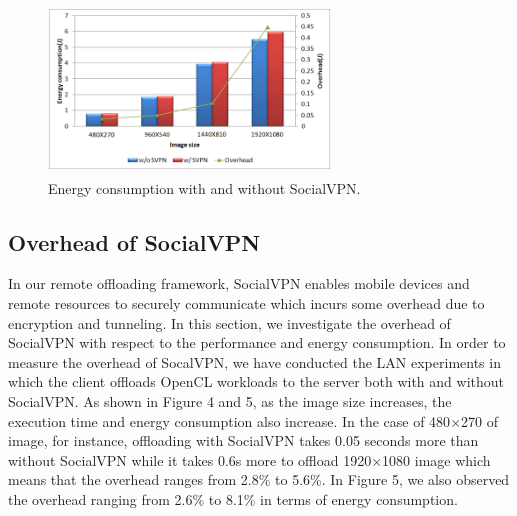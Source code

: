 \documentclass[10pt, conference, compsocconf]{IEEEtran}
\begin{document}
%
\begin{figure}
\centering
\includegraphics[height=4.5cm, width=7.5cm]{Figure/svpn2}
\caption{Energy consumption with and without SocialVPN.
}
\end{figure}
%
\subsection{Overhead of SocialVPN}
%
In our remote offloading framework, SocialVPN enables mobile devices and 
remote resources to securely communicate which incurs some overhead due to 
encryption and tunneling.
%
In this section, we investigate the overhead of SocialVPN with respect to
the performance and energy consumption.
%
In order to measure the overhead of SocalVPN, we have conducted the 
LAN experiments in which the client offloads OpenCL workloads to the server
both with and without SocialVPN.
%
As shown in Figure 4 and 5, as the image size increases, the execution time 
and energy consumption also increase.
%
In the case of 480$\times$270 of image, for instance, offloading with SocialVPN
takes 0.05 seconds more than without SocialVPN while it takes 0.6s more to
offload 1920$\times$1080 image which means that the overhead ranges from 2.8\% 
to 5.6\%.
%
In Figure 5, we also observed the overhead ranging from 2.6\% to 8.1\% in
terms of energy consumption.
%
\end{document}
